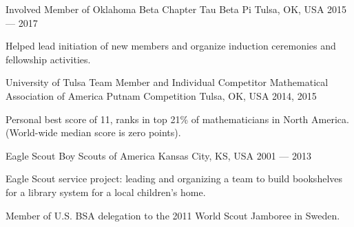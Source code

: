 

\begin{cventries}
	
	\cventry
	{Involved Member of Oklahoma Beta Chapter} %
	{Tau Beta Pi} %
	{Tulsa, OK, USA} %
	{2015 --- 2017} %
	{
		\begin{cvitems} %
			\item {Helped lead initiation of new members and organize induction ceremonies and fellowship activities.}
		\end{cvitems}
	}

  \cventry
    {University of Tulsa Team Member and Individual Competitor} %
    {Mathematical Association of America Putnam Competition} %
    {Tulsa, OK, USA} %
    {2014, 2015} %
    {
      \begin{cvitems} %
        \item {Personal best score of 11, ranks in top 21\% of mathematicians in North America. (World-wide median score is zero points).}
      \end{cvitems}
    }

\cventry
	{Eagle Scout} %
	{Boy Scouts of America} %
	{Kansas City, KS, USA} %
	{2001 --- 2013} %
	{
		\begin{cvitems} %
			\item {Eagle Scout service project: leading and organizing a team to build bookshelves for a library system for a local children's home.}
			\item {Member of U.S. BSA delegation to the 2011 World Scout Jamboree in Sweden.}
		\end{cvitems}
	}
\end{cventries}
